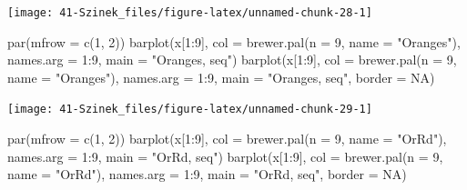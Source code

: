 \documentclass[
]{book}
\newenvironment{Shaded}{\begin{snugshade}}{\end{snugshade}}
\newcommand{\AttributeTok}[1]{\textcolor[rgb]{0.77,0.63,0.00}{#1}}
\newcommand{\ConstantTok}[1]{\textcolor[rgb]{0.00,0.00,0.00}{#1}}
\newcommand{\DecValTok}[1]{\textcolor[rgb]{0.00,0.00,0.81}{#1}}
\newcommand{\FunctionTok}[1]{\textcolor[rgb]{0.00,0.00,0.00}{#1}}
\newcommand{\NormalTok}[1]{#1}
\newcommand{\SpecialCharTok}[1]{\textcolor[rgb]{0.00,0.00,0.00}{#1}}
\newcommand{\StringTok}[1]{\textcolor[rgb]{0.31,0.60,0.02}{#1}}
\begin{document}
\begin{center}\texttt{[image: 41-Szinek\_files/figure-latex/unnamed-chunk-28-1]} \end{center}

\begin{Shaded}
\begin{Highlighting}[]
\FunctionTok{par}\NormalTok{(}\AttributeTok{mfrow =} \FunctionTok{c}\NormalTok{(}\DecValTok{1}\NormalTok{, }\DecValTok{2}\NormalTok{))}
\FunctionTok{barplot}\NormalTok{(x[}\DecValTok{1}\SpecialCharTok{:}\DecValTok{9}\NormalTok{], }\AttributeTok{col =} \FunctionTok{brewer.pal}\NormalTok{(}\AttributeTok{n =} \DecValTok{9}\NormalTok{, }\AttributeTok{name =} \StringTok{"Oranges"}\NormalTok{), }\AttributeTok{names.arg =} \DecValTok{1}\SpecialCharTok{:}\DecValTok{9}\NormalTok{, }
    \AttributeTok{main =} \StringTok{"Oranges, seq"}\NormalTok{)}
\FunctionTok{barplot}\NormalTok{(x[}\DecValTok{1}\SpecialCharTok{:}\DecValTok{9}\NormalTok{], }\AttributeTok{col =} \FunctionTok{brewer.pal}\NormalTok{(}\AttributeTok{n =} \DecValTok{9}\NormalTok{, }\AttributeTok{name =} \StringTok{"Oranges"}\NormalTok{), }\AttributeTok{names.arg =} \DecValTok{1}\SpecialCharTok{:}\DecValTok{9}\NormalTok{, }
    \AttributeTok{main =} \StringTok{"Oranges, seq"}\NormalTok{, }\AttributeTok{border =} \ConstantTok{NA}\NormalTok{)}
\end{Highlighting}
\end{Shaded}

\begin{center}\texttt{[image: 41-Szinek\_files/figure-latex/unnamed-chunk-29-1]} \end{center}

\begin{Shaded}
\begin{Highlighting}[]
\FunctionTok{par}\NormalTok{(}\AttributeTok{mfrow =} \FunctionTok{c}\NormalTok{(}\DecValTok{1}\NormalTok{, }\DecValTok{2}\NormalTok{))}
\FunctionTok{barplot}\NormalTok{(x[}\DecValTok{1}\SpecialCharTok{:}\DecValTok{9}\NormalTok{], }\AttributeTok{col =} \FunctionTok{brewer.pal}\NormalTok{(}\AttributeTok{n =} \DecValTok{9}\NormalTok{, }\AttributeTok{name =} \StringTok{"OrRd"}\NormalTok{), }\AttributeTok{names.arg =} \DecValTok{1}\SpecialCharTok{:}\DecValTok{9}\NormalTok{, }\AttributeTok{main =} \StringTok{"OrRd, seq"}\NormalTok{)}
\FunctionTok{barplot}\NormalTok{(x[}\DecValTok{1}\SpecialCharTok{:}\DecValTok{9}\NormalTok{], }\AttributeTok{col =} \FunctionTok{brewer.pal}\NormalTok{(}\AttributeTok{n =} \DecValTok{9}\NormalTok{, }\AttributeTok{name =} \StringTok{"OrRd"}\NormalTok{), }\AttributeTok{names.arg =} \DecValTok{1}\SpecialCharTok{:}\DecValTok{9}\NormalTok{, }\AttributeTok{main =} \StringTok{"OrRd, seq"}\NormalTok{, }
    \AttributeTok{border =} \ConstantTok{NA}\NormalTok{)}
\end{Highlighting}
\end{Shaded}
\end{document}
